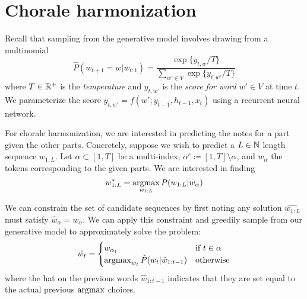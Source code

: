 \documentclass[dissertation.tex]{subfiles}
\begin{document}
\chapter{Chorale harmonization}

Recall that sampling from the generative model involves drawing from a multinomial
\[
  \hat{P}(w_{t+1} = w | w_{t:1}) = \frac{\exp \{ y_{t,w} / T \}}{\sum_{w' \in V} \exp \{ y_{t,w'} / T \}}
\]
where $T \in \mathbb{R}^+$ is the \emph{temperature} and $y_{t,w'}$ is the \emph{score for word $w' \in V$}
at time $t$. We parameterize the score $y_{t,w'} = f(w'; y_{t-1}, h_{t-1}, x_t)$ using a recurrent
neural network.


For chorale harmonization, we are interested in predicting the notes for a part
given the other parts. Concretely, suppose we wish to predict a $L \in \mathbb{N}$
length sequence $w_{1:L}$. Let $\alpha \subset [1,T]$ be a multi-index,
$\alpha^c \coloneqq [1,T] \setminus \alpha$, and $w_\alpha$ the tokens
corresponding to the given parts. We are interested in finding
\begin{equation}
  w_{1:L}^* = \operatorname*{argmax}_{w_{1:L}} P(w_{1:L} | w_{\alpha})
\end{equation}

We can constrain the set of candidate sequences by first noting any solution
$\hat{w_{1:L}}$ must satisfy $\hat{w}_\alpha = w_\alpha$. We can apply this
constraint and greedily sample from our generative model to approximately solve
the problem:
\begin{equation}
  \hat{w_{t}} = \begin{cases}
    w_{\alpha_t} &\mbox{if}~t \in \alpha \\
    \operatorname*{argmax}_{w_t} \hat{P}(w_t | \hat{w}_{1:t-1}) &\mbox{otherwise}
  \end{cases}
\end{equation}
where the hat on the previous words $\hat{w}_{1:t-1}$ indicates that they are
set equal to the actual previous $\operatorname*{argmax}$ choices.
\end{document}

